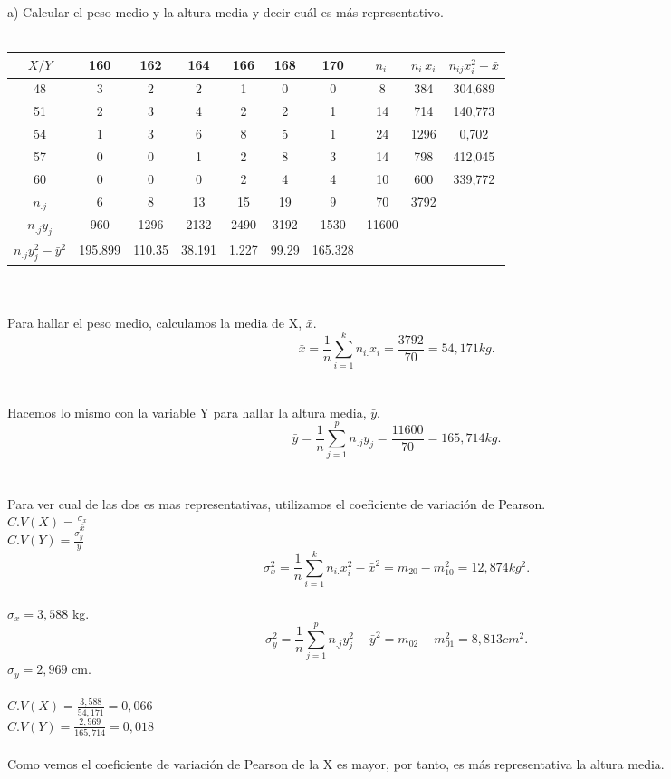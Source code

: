 \documentclass{article}
\begin{document}
    a) Calcular el peso medio y la altura media y decir cuál es más representativo. \\ \\
    \begin{tabular}{| c | c | c | c | c | c | c | c | c | c |}
        \hline
        $X / Y$ & 160 & 162 & 164 & 166 & 168 & 170 & $n_{i.}$ & $n_{i.}x_i$ & $n_{ij}x_i^2- \bar{x}$\\ \hline
        48 & 3 & 2 & 2 & 1 & 0 & 0 & 8 & 384 & 304,689 \\
        51 & 2 & 3 & 4 & 2 & 2 & 1 & 14 & 714 & 140,773 \\
        54 & 1 & 3 & 6 & 8 & 5 & 1 & 24 & 1296 & 0,702 \\
        57 & 0 & 0 & 1 & 2 & 8 & 3 & 14 & 798 & 412,045 \\
        60 & 0 & 0 & 0 & 2 & 4 & 4 & 10 & 600 & 339,772 \\
        $n_{.j}$ & 6 & 8 & 13 & 15 & 19 & 9 & 70 & 3792 & \\
        $n_{.j}y_j$ & 960 & 1296 & 2132 & 2490 & 3192 & 1530 & 11600 & & \\
        $n_{.j}y_j^2-\bar{y}^2$ & 195.899 & 110.35 & 38.191 & 1.227 & 99.29 & 165.328 & & & \\
        \hline
    \end{tabular} \\ \\
    Para hallar el peso medio, calculamos la media de X, $\bar{x}$. \\
    \[ \bar{x} = \frac{1}{n} \sum_{i=1}^{k}n_{i.}x_i = \frac{3792}{70} = 54,171 kg.\] \\ \\
    Hacemos lo mismo con la variable Y para hallar la altura media, $\bar{y}$. \\
    \[ \bar{y} = \frac{1}{n} \sum_{j=1}^{p}n_{.j}y_j = \frac{11600}{70} = 165,714 kg.\] \\ \\
    Para ver cual de las dos es mas representativas, utilizamos el coeficiente de variación de Pearson. \\
    $C.V(X)=\frac{\sigma_x}{\bar{x}}$ \\
    $C.V(Y) = \frac{\sigma_y}{\bar{y}}$ \\
    \[ \sigma_x^2 = \frac{1}{n}\sum_{i=1}^{k}n_{i.}x_i^2-\bar{x}^2 = m_{20}-m_{10}^2 = 12,874 kg^2.\] \\
    $\sigma_x = 3,588$ kg. \\
    \[ \sigma_y^2 = \frac{1}{n}\sum_{j=1}^{p}n_{.j}y_j^2-\bar{y}^2 = m_{02}-m_{01}^2 = 8,813cm^2.\]
    $\sigma_y = 2,969$ cm. \\ \\
    $C.V(X) = \frac{3,588}{54,171} = 0,066$ \\
    $C.V(Y) = \frac{2,969}{165,714} = 0,018$ \\  \\
    Como vemos el coeficiente de variación de Pearson de la X es mayor, por tanto, es más representativa la altura media. \\ \\
    
\end{document}
